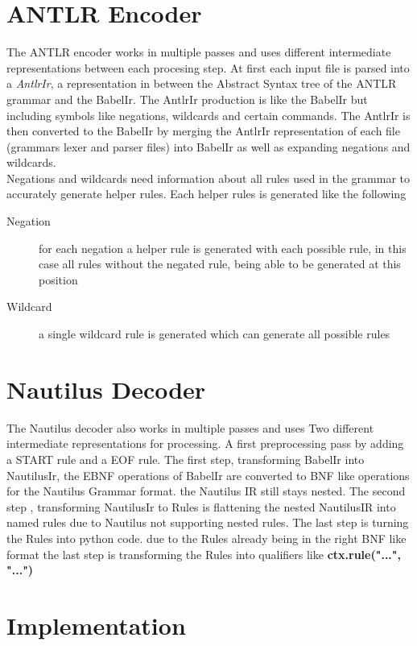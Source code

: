 \documentclass[thesis]{plai}
\begin{document}
\section{ANTLR Encoder}
The ANTLR encoder works in multiple passes and uses different intermediate representations between each procesing step. At first each input file is parsed into a \emph{AntlrIr}, a representation in between the Abstract Syntax tree of the ANTLR grammar and the BabelIr. The AntlrIr production is like the BabelIr but including symbols like negations, wildcards and certain commands. The AntlrIr is then converted to the BabelIr by merging the AntlrIr representation of each file (grammars lexer and parser files) into BabelIr as well as expanding negations and wildcards. \\ 
Negations and wildcards need information about all rules used in the grammar to accurately generate helper rules. Each helper rules is generated like the following 
\begin{description}
    \item[Negation] for each negation a helper rule is generated with each possible rule, in this case all rules without the negated rule, being able to be generated at this position
    \item[Wildcard] a single wildcard rule is generated which can generate all possible rules
\end{description}
\section{Nautilus Decoder}
The Nautilus decoder also works in multiple passes and uses Two different intermediate representations for processing. A first preprocessing pass by adding a START rule and a EOF rule. The first step, transforming BabelIr into NautilusIr, the EBNF operations of BabelIr are converted to BNF like operations for the Nautilus Grammar format. the Nautilus IR still stays nested. The second step , transforming NautilusIr to Rules is flattening the nested NautilusIR into named rules due to Nautilus not supporting nested rules. The last step is turning the Rules into python code. due to the Rules already being in the right BNF like format the last step is transforming the Rules into qualifiers like \textbf{ctx.rule("...", "...")}
\section{Implementation}
\end{document}
